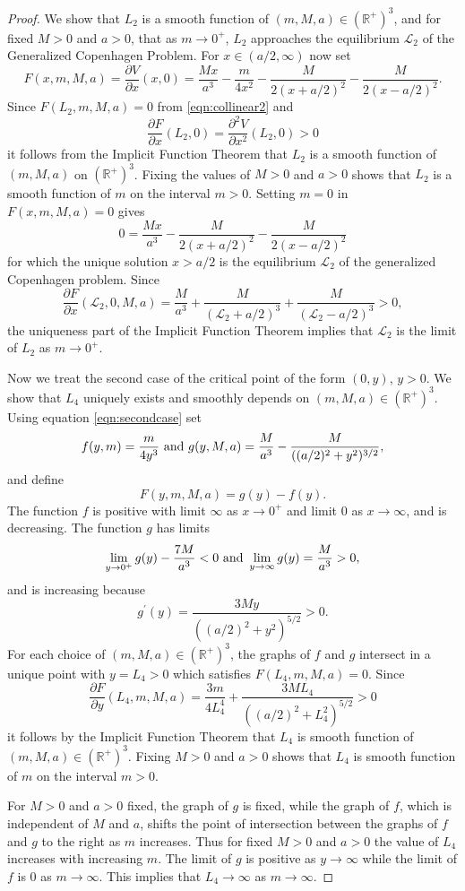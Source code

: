 \documentclass[12pt]{article}
\begin{document}
\begin{proof}
We show that $L_2$ is a smooth function of $(m,M,a)\in({\mathbb R}^+)^3$, and for fixed $M>0$ and $a>0$, that as $m\to 0^+$, $L_2$ approaches the equilibrium ${\mathcal L}_2$ of the Generalized Copenhagen Problem. For $x\in(a/2,\infty)$ now set
\[ F(x,m,M,a) =  \frac{\partial V}{\partial x}(x,0) = \frac{Mx}{a^3} - \frac{m}{4x^2} - \frac{M}{2(x+a/2)^2} - \frac{M}{2(x-a/2)^2}.\]
Since $F(L_2,m,M,a) = 0$ from \eqref{eqn:collinear2} and
\[ \frac{\partial F}{\partial x} (L_2,0) = \frac{\partial^2 V}{\partial x^2}(L_2,0) > 0\]
it follows from the Implicit Function Theorem that $L_2$ is a smooth function of $(m,M,a)$ on $({\mathbb R}^+)^3$. Fixing the values of $M>0$ and $a>0$ shows that $L_2$ is a smooth function of $m$ on the interval $m>0$. Setting $m=0$ in $F(x,m,M,a) = 0$ gives
\[ 0 = \frac{Mx}{a^3}  - \frac{M}{2(x+a/2)^2} - \frac{M}{2(x-a/2)^2}\]
for which the unique solution $x>a/2$ is the equilibrium ${\mathcal L}_2$ of the generalized Copenhagen problem. Since
\[ \frac{\partial F}{\partial x}({\mathcal L}_2,0,M,a) = \frac{M}{a^3} + \frac{M}{( {\mathcal L}_2 + a/2)^3} + \frac{M}{({\mathcal L}_2 - a/2)^3} > 0,\]
the uniqueness part of the Implicit Function Theorem implies that ${\mathcal L}_2$ is the limit of $L_2$ as $m\to 0^+$.

Now we treat the second case of the critical point of the form $(0,y)$, $y>0$. We show that $L_4$ uniquely exists and smoothly depends on $(m,M,a)\in ({\mathbb R}^+)^3$. Using equation \eqref{eqn:secondcase} set 
\[ f(y,m) = \frac{m}{4y^3} {\rm\ and\ } g(y,M,a) = \frac{M}{a^3} - \frac{M}{((a/2)^2 + y^2)^{3/2}},\]
and define
\[ F(y,m,M,a) = g(y) - f(y).\]
The function $f$ is positive with limit $\infty$ as $x\to 0^+$ and limit $0$ as $x\to\infty$, and is decreasing. The function $g$ has limits
\[ \lim_{y\to 0^+} g(y) -\frac{7M}{a^3}<0 {\rm\ and \ }
\lim_{y\to \infty} g(y) = \frac{M}{a^3} >0,\]
and is increasing because
\[ g^\prime(y) = \frac{3My}{((a/2)^2 + y^2)^{5/2}} >0.\]
For each choice of $(m,M,a)\in ({\mathbb R}^+)^3$, the graphs of $f$ and $g$ intersect in a unique point with $y = L_4>0$ which satisfies $F(L_4,m,M,a) = 0$. Since 
\[ \frac{\partial F}{\partial y}(L_4,m,M,a) = \frac{3m}{4L_4^4} + \frac{3M L_4}{((a/2)^2 + L_4^2)^{5/2}} > 0\]
it follows by the Implicit Function Theorem that $L_4$ is smooth function of $(m,M,a) \in ({\mathbb R}^+)^3$. Fixing $M>0$ and $a>0$ shows that $L_4$ is smooth function of $m$ on the interval $m>0$. 

For $M>0$ and $a>0$ fixed, the graph of $g$ is fixed, while the graph of $f$, which is independent of $M$ and $a$, shifts the point of intersection between the graphs of $f$ and $g$ to the right as $m$ increases. Thus for fixed $M>0$ and $a>0$ the value of $L_4$ increases with increasing $m$. The limit of $g$ is positive as $y\to\infty$ while the limit of $f$ is $0$ as $m\to\infty$. This implies that $L_4\to\infty$ as $m\to\infty$.


\end{proof}
\end{document}

